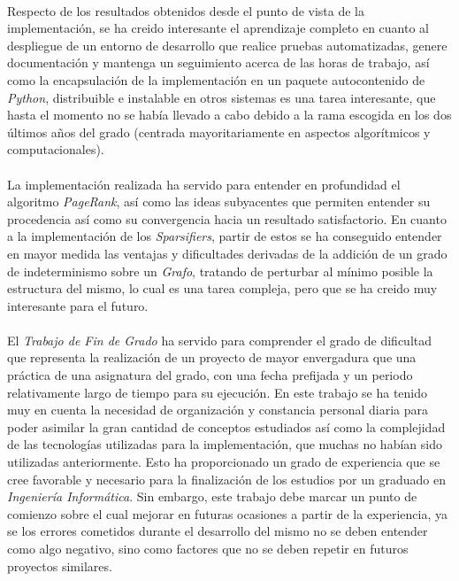 \documentclass{subfiles}
\begin{document}
      \paragraph{}
      Respecto de los resultados obtenidos desde el punto de vista de la implementación, se ha creido interesante el aprendizaje completo en cuanto al despliegue de un entorno de desarrollo que realice pruebas automatizadas, genere documentación y mantenga un seguimiento acerca de las horas de trabajo, así como la encapsulación de la implementación en un paquete autocontenido de \emph{Python}, distribuible e instalable en otros sistemas es una tarea interesante, que hasta el momento no se había llevado a cabo debido a la rama escogida en los dos últimos años del grado (centrada mayoritariamente en aspectos algorítmicos y computacionales).

      \paragraph{}
      La implementación realizada ha servido para entender en profundidad el algoritmo \emph{PageRank}, así como las ideas subyacentes que permiten entender su procedencia así como su convergencia hacia un resultado satisfactorio. En cuanto a la implementación de los \emph{Sparsifiers}, partir de estos se ha conseguido entender en mayor medida las ventajas y dificultades derivadas de la addición de un grado de indeterminismo sobre un \emph{Grafo}, tratando de perturbar al mínimo posible la estructura del mismo, lo cual es una tarea compleja, pero que se ha creido muy interesante para el futuro.

      \paragraph{}
      El \emph{Trabajo de Fin de Grado} ha servido para comprender el grado de dificultad que representa la realización de un proyecto de mayor envergadura que una práctica de una asignatura del grado, con una fecha prefijada y un periodo relativamente largo de tiempo para su ejecución. En este trabajo se ha tenido muy en cuenta la necesidad de organización y constancia personal diaria para poder asimilar la gran cantidad de conceptos estudiados así como la complejidad de las tecnologías utilizadas para la implementación, que muchas no habían sido utilizadas anteriormente. Esto ha proporcionado un grado de experiencia que se cree favorable y necesario para la finalización de los estudios por un graduado en \emph{Ingeniería Informática}. Sin embargo, este trabajo debe marcar un punto de comienzo sobre el cual mejorar en futuras ocasiones a partir de la experiencia, ya se los errores cometidos durante el desarrollo del mismo no se deben entender como algo negativo, sino como factores que no se deben repetir en futuros proyectos similares.
\end{document}
